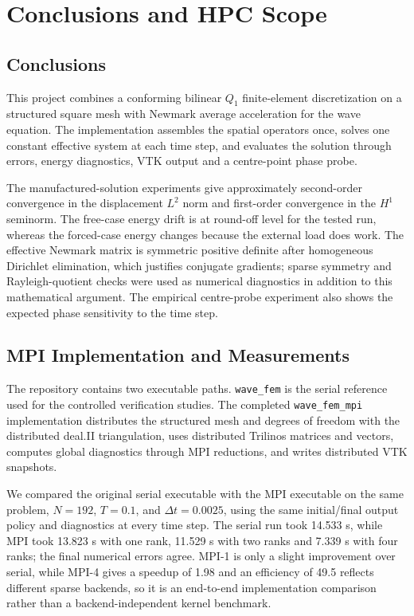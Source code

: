 \chapter{Conclusions and HPC Scope}
\small
\sloppy

\section{Conclusions}
This project combines a conforming bilinear \(Q_1\) finite-element
discretization on a structured square mesh with Newmark average acceleration
for the wave equation. The implementation assembles the spatial operators once,
solves one constant effective system at each time step, and evaluates the
solution through errors, energy diagnostics, VTK output and a centre-point phase
probe.

The manufactured-solution experiments give approximately second-order
convergence in the displacement \(L^2\) norm and first-order convergence in the
\(H^1\) seminorm. The free-case energy drift is at round-off level for the
tested run, whereas the forced-case energy changes because the external load
does work. The effective Newmark matrix is symmetric positive definite after
homogeneous Dirichlet elimination, which justifies conjugate gradients; sparse
symmetry and Rayleigh-quotient checks were used as numerical diagnostics in
addition to this mathematical argument. The empirical centre-probe experiment
also shows the expected phase sensitivity to the time step.

\section{MPI Implementation and Measurements}
The repository contains two executable paths. \texttt{wave\_fem} is the
serial reference used for the controlled verification studies. The completed
\texttt{wave\_fem\_mpi} implementation distributes the structured mesh and
degrees of freedom with the distributed deal.II triangulation, uses
distributed Trilinos matrices and vectors, computes global diagnostics through
MPI reductions, and writes distributed VTK snapshots.

We compared the original serial executable with the MPI executable on the same
problem, \(N=192\), \(T=0.1\), and \(\Delta t=0.0025\), using the same
initial/final output policy and diagnostics at every time step. The serial run
took 14.533 s, while MPI took 13.823 s with one rank, 11.529 s with two ranks
and 7.339 s with four ranks; the final numerical errors agree. MPI-1 is only a
slight improvement over serial, while MPI-4 gives a speedup of 1.98 and an
efficiency of 49.5%
reflects different sparse backends, so it is an end-to-end implementation
comparison rather than a backend-independent kernel benchmark.

